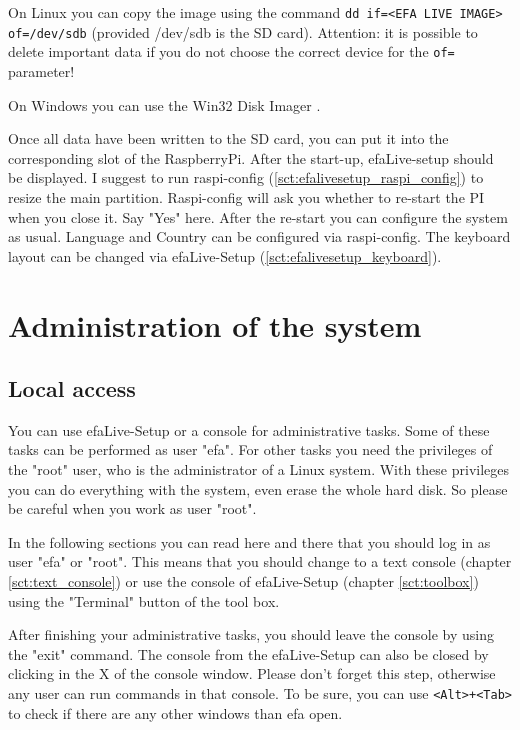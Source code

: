 \documentclass[a4paper,12pt,twoside]{article}
\begin{document}
On Linux you can copy the image using the command \texttt{dd
if={\textless}EFA LIVE IMAGE{\textgreater} of=/dev/sdb}
(provided /dev/sdb is the SD card). Attention: it is possible to
delete important data if you do not choose the correct device for the
\texttt{of=} parameter!

On Windows you can use the Win32 Disk Imager \cite{IMG1}.

Once all data have been written to the SD card, you can put it into the
corresponding slot of the RaspberryPi. After the start-up, efaLive-setup should be 
displayed. I suggest to run raspi-config (\ref{sct:efalivesetup_raspi_config}) to 
resize the main partition. Raspi-config 
will ask you whether to re-start the PI when you close it. Say "Yes" here. After the 
re-start you can configure the system as usual. Language and Country can be configured 
via raspi-config. The keyboard layout can be changed via efaLive-Setup (\ref{sct:efalivesetup_keyboard}).


\section{Administration of the system}
\label{sct:administration}
\subsection{Local access}
\label{sct:local_access}
You can use efaLive-Setup or a console for
administrative tasks. Some of these tasks can be performed as user
"efa". For other tasks you need the
privileges of the "root" user, who is the
administrator of a Linux system. With these privileges you can do
everything with the system, even erase the whole hard disk. So please
be careful when you work as user "root".

In the following sections you can read here and there that you should
log in as user "efa" or
"root". This means that you should change
to a text console (chapter \ref{sct:text_console}) or use
the console of efaLive-Setup (chapter \ref{sct:toolbox})
using the "Terminal" button of the tool
box.

After finishing your administrative tasks, you should leave the console
by using the "exit" command. The console
from the efaLive-Setup can also be closed by clicking in the X of the
console window. Please don't forget this step,
otherwise any user can run commands in that console. To be sure, you
can use \texttt{{\textless}Alt{\textgreater}+{\textless}Tab{\textgreater}} to
check if there are any other windows than efa open.
\end{document}
